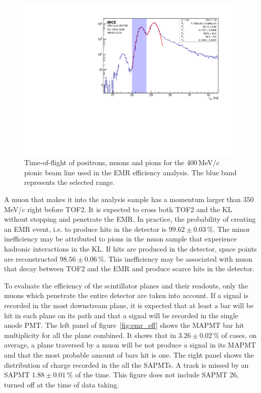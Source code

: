 \begin{figure}[htb!]
    \begin{center}
    	\includegraphics[width=0.7\columnwidth]{tof12.pdf}  		
    	\caption{Time-of-flight of positrons, muons and pions for the 400\,MeV/$c$ pionic beam line used in the EMR efficiency analysis. The blue band represents the selected range.}
    	\label{fig:emr_eff_tof}
    \end{center}
\end{figure}

A muon that makes it into the analysis sample has a momentum larger than 350\,MeV/$c$ right before TOF2. It is expected to cross both TOF2 and the KL without stopping and penetrate the EMR. In practice, the probability of creating an EMR event, i.e. to produce hits in the detector is $99.62\pm0.03\,\%$. The minor inefficiency may be attributed to pions in the muon sample that experience hadronic interactions in the KL. If hits are produced in the detector, space points are reconstructed $98.56\pm0.06\,\%$. This inefficiency may be associated with muon that decay between TOF2 and the EMR and produce scarce hits in the detector.

To evaluate the efficiency of the scintillator planes and their readouts, only the muons which penetrate the entire detector are taken into account. If a signal is recorded in the most downstream plane, it is expected that at least a bar will be hit in each plane on its path and that a signal will be recorded in the single anode PMT. The left panel of figure~\ref{fig:emr_eff} shows the MAPMT bar hit multiplicity for all the plane combined. It shows that in $3.26\pm0.02\,\%$ of cases, on average, a plane traversed by a muon will be not produce a signal in its MAPMT and that the most probable amount of bars hit is one. The right panel shows the distribution of charge recorded in the all the SAPMTs. A track is missed by an SAPMT $1.88\pm0.01\,\%$ of the time. This figure does not include SAPMT 26, turned off at the time of data taking.

